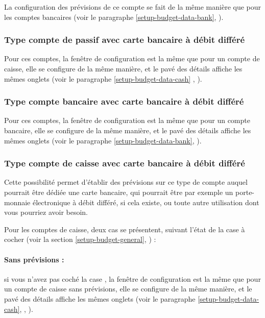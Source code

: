 La configuration des prévisions de ce compte se fait de la même manière que pour les comptes bancaires (voir le paragraphe \vref{setup-budget-data-bank}, ).


\subsubsection{Type compte de passif avec carte bancaire à débit différé\label{setup-budget-data-liabilityWithCard}}

Pour ces comptes, la fenêtre de configuration est la même que pour un compte de caisse, elle se configure de la même manière, et le pavé des détails affiche les mêmes onglets (voir le paragraphe \vref{setup-budget-data-cash} , ).

\ifIllustration
\newpage
\fi


\subsubsection{Type compte bancaire avec carte bancaire à débit différé\label{setup-budget-data-bankWithCard}}

Pour ces comptes, la fenêtre de configuration est la même que pour un compte bancaire, elle se configure de la même manière, et le pavé des détails affiche les mêmes onglets (voir le paragraphe \vref{setup-budget-data-bank}, ).


\subsubsection{Type compte de caisse avec carte bancaire à débit différé\label{setup-budget-data-cashWithCard}}

Cette possibilité permet d'établir des prévisions sur ce type de compte auquel pourrait  être dédiée une carte bancaire, qui pourrait être par exemple un porte-monnaie électronique à débit différé, si cela existe, ou toute autre utilisation dont vous pourriez avoir besoin.

Pour les comptes de caisse, deux cas se présentent, suivant l'état de la case à cocher    (voir la section \vref{setup-budget-general}, ) :

\paragraph{Sans prévisions :} si vous n'avez pas coché la case , la fenêtre de configuration est la même que pour un compte de caisse sans prévisions, elle se configure de la même manière, et le pavé des détails affiche les mêmes onglets (voir le paragraphe \vref{setup-budget-data-cash}, , ).

